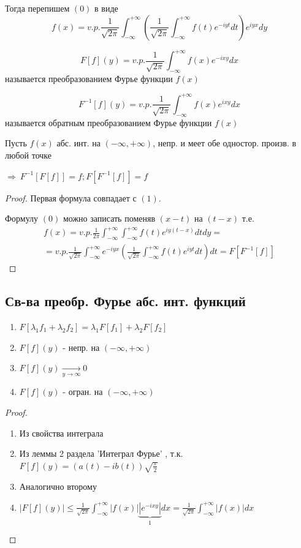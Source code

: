 \documentclass{article}
\theoremstyle{definition}
\numberwithin{theorem}{section}
\numberwithin{lemma}{section}
\numberwithin{definition}{section}
\numberwithin{corollary}{section}
\numberwithin{equation}{section}
\let\implies\Rightarrow
\begin{document}
Тогда перепишем $(0)$ в виде
\[
  f(x)=v.p. \frac{1}{\sqrt{2\pi}}\int_{-\infty}^{+\infty}\left(\frac{1}{\sqrt{2\pi}}\int_{-\infty}^{+\infty}f(t)e^{-iyt}dt\right)e^{iyx}dy \tag{1}
\]
\begin{definition}
  \[
    F[f](y)=v.p. \frac{1}{\sqrt{2\pi}}\int_{-\infty}^{+\infty}f(x)e^{-ixy}dx
  \]
  называется преобразованием Фурье функции $f(x)$
\end{definition}
\begin{definition}
  \[
    F^{-1}[f](y)=v.p. \frac{1}{\sqrt{2\pi}}\int_{-\infty}^{+\infty}f(x)e^{ixy}dx
  \]
  называется обратным преобразованием Фурье функции $f(x)$
\end{definition}
\begin{theorem}[Т1]
  Пусть $f(x)$ абс. инт. на $(-\infty,+\infty)$, непр. и меет обе одностор. произв. в любой точке

  $\implies \ F^{-1}[F[f]]=f; F[F^{-1}[f]]=f$
\end{theorem}
\begin{proof}
  Первая формула совпадает с $(1)$.

  Формулу $(0)$ можно записать поменяв $(x-t)$ на $(t-x)$ т.е.
  \begin{gather*}
    f(x) = v.p. \frac{1}{2\pi}\int_{-\infty}^{+\infty}\int_{-\infty}^{+\infty}f(t)e^{iy(t-x)}dtdy = \\ 
    = v.p. \frac{1}{\sqrt{2\pi}}\int_{-\infty}^{+\infty}e^{-iyx}\left(\frac{1}{\sqrt{2\pi}}\int_{-\infty}^{+\infty}f(t)e^{iyt}dt\right)dt = F[F^{-1}[f]]
  \end{gather*}
\end{proof}
\subsection{Св-ва преобр. Фурье абс. инт. функций}
\begin{enumerate}
  \item $F[\lambda_1 f_1+\lambda_2f_2]=\lambda_1F[f_1]+\lambda_2F[f_2]$
  \item $F[f](y)$ - непр. на $(-\infty,+\infty)$
  \item $F[f](y) \underset{y\to \infty}{\to}0$
  \item $F[f](y)$ - огран. на $(-\infty,+\infty)$
\end{enumerate}
\begin{proof}
  \phantom{.}

  \begin{enumerate}
    \item Из свойства интеграла
    \item Из леммы 2 раздела 'Интеграл Фурье'
      , т.к. $F[f](y)=(a(t)-ib(t))\sqrt{\frac{\pi}{2}}$
    \item Аналогично второму
    \item $|F[f](y)|\le \frac{1}{\sqrt{2\pi}}\int_{-\infty}^{+\infty}|f(x)|\underbrace{|e^{-ixy}|}_{1}dx=\frac{1}{\sqrt{2\pi}}\int_{-\infty}^{+\infty}|f(x)|dx$
  \end{enumerate}
\end{proof}
\end{document}
